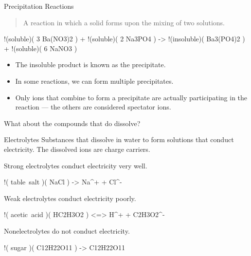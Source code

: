 \documentclass[notes=hide]{beamer}
\begin{document}
\begin{frame}{Precipitation Reactions}
	\begin{quote}
		A reaction in which a solid forms upon the mixing of two
		solutions.
	\end{quote}
	\begin{reaction*}
		!(soluble)( 3 Ba(NO3)2\aq{} ) + !(soluble)( 2 Na3PO4\aq{} ) ->
		!(insoluble)( Ba3(PO4)2\sld{} ) + !(soluble)( 6
		NaNO3\aq{} )
	\end{reaction*}

	\begin{itemize}
		\item The \alert{insoluble} product is known as the
			\alert{precipitate}.
		\item In some reactions, we can form multiple precipitates.
		\item Only ions that combine to form a precipitate are actually
			participating in the reaction --- the others are
			considered \alert{spectator} ions.
	\end{itemize}
\end{frame}

%

\begin{frame}{What about the compounds that do dissolve?}
	\begin{block}{Electrolytes}
		Substances that dissolve in water to form solutions that conduct
		electricity. The dissolved ions are \alert{charge carriers}.
	\end{block}

	\pause

	\alert{Strong} electrolytes conduct electricity \alert{very
	  well}.
	  \begin{reaction*}
	  	!( table~salt )( NaCl\sld{} ) -> Na^{+}\aq{} +
	  	Cl^{-}\aq{}
	  \end{reaction*}

	  \pause

	\alert{Weak} electrolytes conduct electricity
	  \alert{poorly}.
	  \begin{reaction*}
	  	!( acetic~acid )( HC2H3O2\aq{} ) <=> H^{+}\aq{}
	  	+ C2H3O2^{-}\aq{}
	  \end{reaction*}

	  \pause

	\alert{Nonelectrolytes} do not conduct electricity.
	\begin{reaction*}
		!( sugar )( C12H22O11\sld{} ) ->
		C12H22O11\aq{}
	\end{reaction*}
\end{frame}
\end{document}
